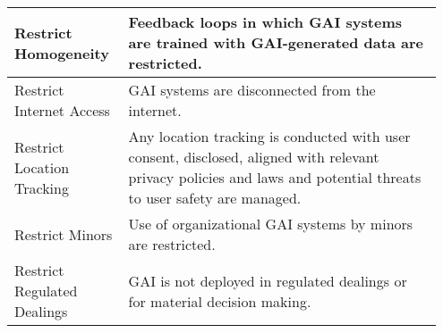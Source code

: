 \documentclass[fleqn]{article}
\begin{document}
\begin{table}[H]
\begin{tabular}{|m{0.25\linewidth} |m{0.70\linewidth} |}
		Restrict Homogeneity & Feedback loops in which GAI systems are trained with GAI-generated data are restricted. \\ 
		\hline
		Restrict Internet Access & GAI systems are disconnected from the internet.  \\ 
		\hline		
		Restrict Location Tracking & Any location tracking is conducted with user consent, disclosed, aligned with relevant privacy policies and laws and potential threats to user safety are managed.   \\ 
		\hline		
		Restrict Minors & Use of organizational GAI systems by minors are restricted.  \\ 
		\hline
		Restrict Regulated Dealings & GAI is not deployed in regulated dealings or for material decision making.  \\ 
		\hline			
	\end{tabular}
\end{table}
\pagebreak
\end{document}
